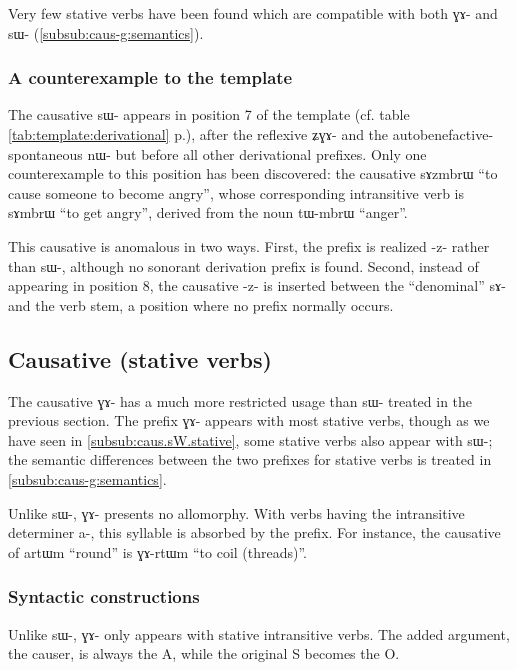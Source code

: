 \documentclass[oldfontcommands,oneside,a4paper,11pt]{memoir}
\newcommand{\ipa}[1]{{\phon #1}} %
\newcommand{\jg}[1]{\ipa{#1}\index{Japhug #1}}
\begin{document}
  Very few stative verbs have been found which are compatible with both \ipa{ɣɤ-} and \ipa{sɯ-} (\ref{subsub:caus-g:semantics}).
 
 
 
 
 \subsubsection{A counterexample to the template} \label{subsub:counterexample.caus}
 The causative \ipa{sɯ-} appears in position 7 of the template (cf. table \ref{tab:template:derivational} p.\pageref{tab:template:derivational}), after the reflexive \ipa{ʑɣɤ-} and the autobenefactive-spontaneous \ipa{nɯ-} but before all other derivational prefixes. Only one counterexample to this position has been discovered: the causative \ipa{sɤzmbrɯ} ``to cause someone to become angry'', whose corresponding intransitive verb is \ipa{sɤmbrɯ} ``to get angry'', derived from the noun \ipa{tɯ-mbrɯ} ``anger''.
  
 
 This causative is anomalous in two ways. First, the prefix is realized \ipa{-z-} rather than \ipa{sɯ-}, although no sonorant derivation prefix  is found. Second, instead of appearing in position 8, the causative  \ipa{-z-} is inserted between the ``denominal'' \ipa{sɤ-} and the verb stem, a position where no prefix normally occurs.

\subsection{Causative (stative verbs)} \label{sub:caus2}

The causative \ipa{ɣɤ-} has a much more restricted usage than \ipa{sɯ-} treated in the previous section. The prefix \ipa{ɣɤ-}  appears with most stative verbs, though as we have seen in \ref{subsub:caus.sW.stative},  some stative verbs also appear with \ipa{sɯ-}; the semantic differences between the two prefixes for stative verbs is treated in \ref{subsub:caus-g:semantics}.


Unlike \ipa{sɯ-}, \ipa{ɣɤ-} presents no allomorphy. With verbs having the intransitive determiner \ipa{a-}, this syllable is absorbed by the prefix. For instance, the causative of \jg{artɯm} ``round'' is \jg{ɣɤ-rtɯm} ``to coil (threads)''.
\subsubsection{Syntactic constructions} \label{subsub:caus-g:syntax}
Unlike \ipa{sɯ-}, \ipa{ɣɤ-} only appears with stative intransitive verbs. The added argument, the causer, is always the A, while the original S becomes the O.
\end{document}
